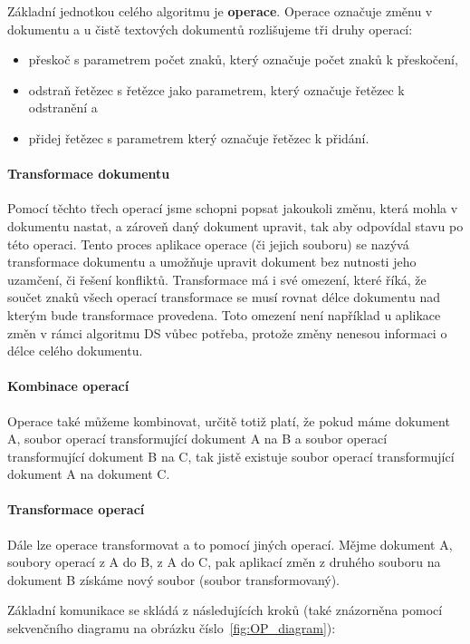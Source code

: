 Základní jednotkou celého algoritmu je \textbf{operace}.
Operace označuje změnu v dokumentu a u čistě textových dokumentů rozlišujeme tři druhy operací:
\begin{itemize}
    \item přeskoč s parametrem počet znaků, který označuje počet znaků k přeskočení,
    \item odstraň řetězec s řetězce jako parametrem, který označuje řetězec k odstranění a
    \item přidej řetězec s parametrem který označuje řetězec k přidání.~\cite{ot:aboutOT}
\end{itemize}

\paragraph{Transformace dokumentu}
Pomocí těchto třech operací jsme schopni popsat jakoukoli změnu, která mohla v dokumentu nastat, a zároveň daný dokument upravit, tak aby odpovídal stavu po této operaci.
Tento proces aplikace operace (či jejich souboru) se nazývá transformace dokumentu a umožňuje upravit dokument bez nutnosti jeho uzamčení, či řešení konfliktů.
Transformace má i své omezení, které říká, že součet znaků všech operací transformace se musí rovnat délce dokumentu nad kterým bude transformace provedena.
Toto omezení není například u aplikace změn v rámci algoritmu \gls{DS} vůbec potřeba, protože změny nenesou informaci o délce celého dokumentu.

\paragraph{Kombinace operací}
Operace také můžeme kombinovat, určitě totiž platí, že pokud máme dokument A, soubor operací transformující dokument A na B a soubor operací transformující dokument B na C, tak jistě existuje soubor operací transformující dokument A na dokument C.

\paragraph{Transformace operací}
Dále lze operace transformovat a to pomocí jiných operací.
Mějme dokument A, soubory operací z A do B, z A do C, pak aplikací změn z druhého souboru na dokument B získáme nový soubor (soubor transformovaný).~\cite{ot:codecommit}

Základní komunikace se skládá z následujících kroků (také znázorněna pomocí sekvenčního diagramu na obrázku číslo~\ref{fig:OP_diagram}):

